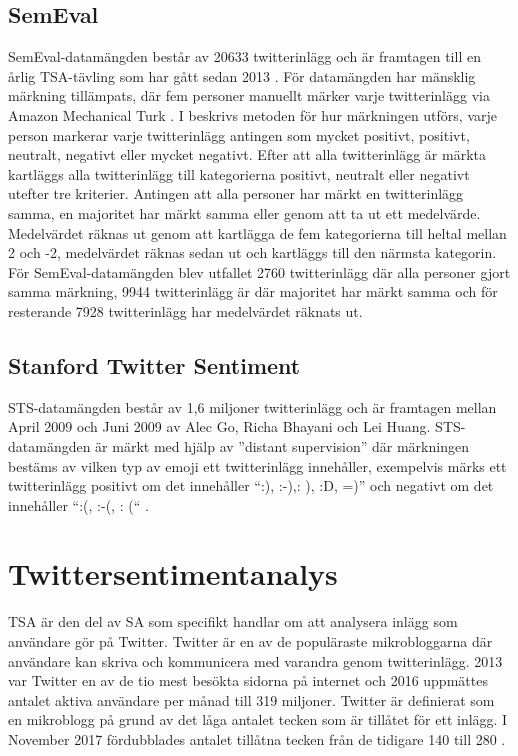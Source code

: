 \documentclass{kaumasters} %
\begin{document}
\subsection{SemEval} \label{DSse}
SemEval-datamängden består av 20633 twitterinlägg och är framtagen till en årlig TSA-tävling som har gått sedan 2013 \cite{SemEval:002}. 
För datamängden har mänsklig märkning tillämpats, där fem personer manuellt märker varje twitterinlägg via Amazon Mechanical Turk \cite{SemEval:003}.
I \cite{SemEval:004} beskrivs metoden för hur märkningen utförs, varje person markerar varje twitterinlägg antingen som mycket positivt, positivt, neutralt, negativt eller mycket negativt. Efter att alla twitterinlägg är märkta kartläggs alla twitterinlägg till kategorierna positivt, neutralt eller negativt utefter tre kriterier. Antingen att alla personer har märkt en twitterinlägg samma, en majoritet har märkt samma eller genom att ta ut ett medelvärde. Medelvärdet räknas ut genom att kartlägga de fem kategorierna till heltal mellan 2 och -2, medelvärdet räknas sedan ut och kartläggs till den närmsta kategorin. För SemEval-datamängden blev utfallet 2760 twitterinlägg där alla personer gjort samma märkning, 9944 twitterinlägg är där majoritet har märkt samma och för resterande 7928 twitterinlägg har medelvärdet räknats ut. 

\subsection{Stanford Twitter Sentiment} \label{DSsts}
STS-datamängden består av 1,6 miljoner twitterinlägg och är framtagen mellan April 2009 och Juni 2009 av Alec Go, Richa Bhayani och Lei Huang. STS-datamängden är märkt med hjälp av ''distant supervision'' där märkningen bestäms av vilken typ av emoji \cite{wiki:010} ett twitterinlägg innehåller, exempelvis märks ett twitterinlägg positivt om det innehåller “:), :-),: ), :D, =)” och negativt om det innehåller “:(, :-(, : (“ \cite{sts:001}. 

\section{Twittersentimentanalys} \label{TSA}
TSA är den del av SA som specifikt handlar om att analysera inlägg som användare gör på Twitter. Twitter är en av de populäraste mikrobloggarna där användare kan skriva och kommunicera med varandra genom twitterinlägg. 2013 var Twitter en av de tio mest besökta sidorna på internet och 2016 uppmättes antalet aktiva användare per månad till 319 miljoner. Twitter är definierat som en mikroblogg på grund av det låga antalet tecken som är tillåtet för ett inlägg. I November 2017 fördubblades antalet tillåtna tecken från de tidigare 140 till 280 \cite{wiki:008}. 
\end{document}
